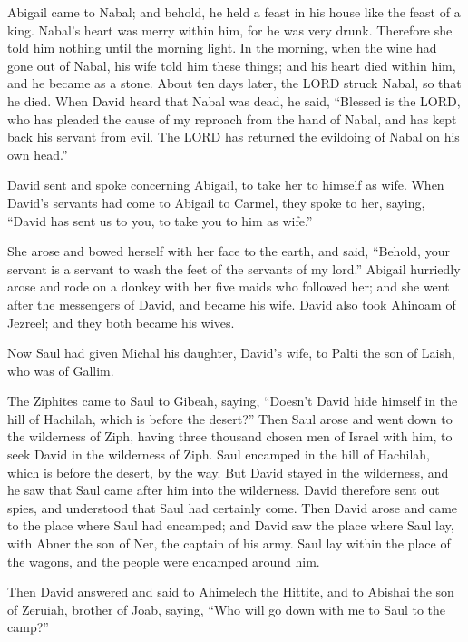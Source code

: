 \myverse{}Abigail came to Nabal; and behold, he held a feast in his house
like the feast of a king. Nabal’s heart was merry within him, for he was very drunk. Therefore she told
him nothing until the morning light.
\myverse{}In the morning, when the wine had gone out of Nabal, his wife told him these
things; and his heart died within him, and he became as a stone.
\myverse{}About ten days later, the LORD struck Nabal, so that he died.
\myverse{}When David heard that Nabal was dead, he said, “Blessed is the LORD, who
has pleaded the cause of my reproach from the hand of Nabal, and has kept back his servant from evil.
The LORD has returned the evildoing of Nabal on his own head.”

David sent and spoke concerning Abigail, to take her to himself as wife.
\myverse{}When David’s servants had come to Abigail to Carmel, they spoke to her, saying,
“David has sent us to you, to take you to him as wife.”

\myverse{}She arose and bowed herself with her face to the earth, and
said, “Behold, your servant is a servant to wash the feet of the servants of my lord.”
\myverse{}Abigail hurriedly arose and rode on a donkey with her five maids who followed
her; and she went after the messengers of David, and became his wife.
\myverse{}David also took Ahinoam of Jezreel; and they both became his wives.

\myverse{}Now Saul had given Michal his daughter, David’s wife, to Palti
the son of Laish, who was of Gallim.


\mychapter{} \myverse*{}The Ziphites came to Saul to Gibeah, saying, “Doesn’t David hide
himself in the hill of Hachilah, which is before the desert?”
\myverse{}Then Saul arose and went down to the wilderness of Ziph, having three thousand
chosen men of Israel with him, to seek David in the wilderness of Ziph.
\myverse{}Saul encamped in the hill of Hachilah, which is before the desert, by the way.
But David stayed in the wilderness, and he saw that Saul came after him into the wilderness.
\myverse{}David therefore sent out spies, and understood that Saul had certainly come.
\myverse{}Then David arose and came to the place where Saul had encamped; and David saw
the place where Saul lay, with Abner the son of Ner, the captain of his army. Saul lay within the place
of the wagons, and the people were encamped around him.

\myverse{}Then David answered and said to Ahimelech the Hittite, and to
Abishai the son of Zeruiah, brother of Joab, saying, “Who will go down with me to Saul to the camp?”

